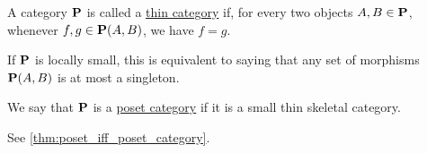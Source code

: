 \begin{definition}\label{def:thin_category}\cite{nLab:thin_category}
  A category $\operatorname{\mathbf{P}}$ is called a \ul{thin category} if, for every two objects $A, B \in \operatorname{\mathbf{P}}$, whenever $f, g \in \operatorname{\mathbf{P}}(A, B)$, we have $f = g$.

  If $\operatorname{\mathbf{P}}$ is locally small, this is equivalent to saying that any set of morphisms $\operatorname{\mathbf{P}}(A, B)$ is at most a singleton.
\end{definition}

\begin{definition}\label{def:poset_category}
  We say that $\operatorname{\mathbf{P}}$ is a \ul{poset category} if it is a small thin skeletal category.

  See \cref{thm:poset_iff_poset_category}.
\end{definition}

